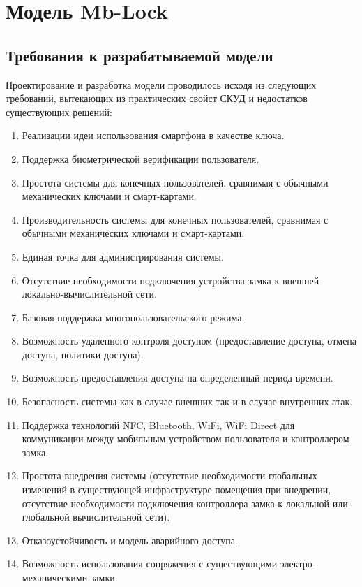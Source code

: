 \chapter{Модель Mb-Lock} \label{chapt2}

\section{Требования к разрабатываемой модели} \label{sect2_1}

Проектирование и разработка модели проводилось исходя из следующих требований,
вытекающих из практических свойст СКУД и недостатков существующих решений:
\begin{enumerate}
	\item Реализации идеи использования смартфона в качестве ключа.
	\item Поддержка биометрической верификации пользователя.
	\item Простота системы для конечных пользователей, сравнимая с обычными механических ключами и смарт-картами.
	\item Производительность системы для конечных пользователей, сравнимая с обычными механических ключами и смарт-картами.
	\item Единая точка для администрирования системы.
	\item Отсутствие необходимости подключения устройства замка к внешней локально-вычислительной сети.
	\item Базовая поддержка многопользовательского режима.
	\item Возможность удаленного контроля доступом (предоставление доступа, отмена доступа, политики доступа).
	\item Возможность предоставления доступа на определенный период времени.
	\item Безопасность системы как в случае внешних так и в случае внутренних атак.
	\item Поддержка технологий NFC, Bluetooth, WiFi, WiFi Direct для коммуникации между мобильным устройством пользователя и контроллером замка.
	\item Простота внедрения системы (отсутствие необходимости глобальных изменений в существующей инфраструктуре помещения при внедрении, отсутствие необходимости подключения контроллера замка к локальной или глобальной вычислительной сети).
	\item Отказоустойчивость и модель аварийного доступа.
	\item Возможность использования сопряжения с существующими электро-механическими замки.
\end{enumerate}

